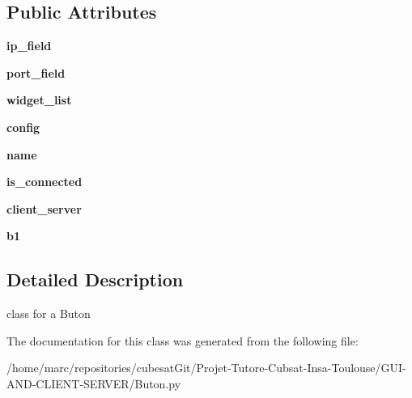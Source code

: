 \subsection*{Public Attributes}
\begin{DoxyCompactItemize}
\item 
\hypertarget{classButon_1_1ConnectButon_a9b455e937c6ad5aab8d6e60ddd9496f5}{{\bfseries ip\+\_\+field}}\label{classButon_1_1ConnectButon_a9b455e937c6ad5aab8d6e60ddd9496f5}

\item 
\hypertarget{classButon_1_1ConnectButon_ab54e8a2c425b7a4c6aff44c2623fbd24}{{\bfseries port\+\_\+field}}\label{classButon_1_1ConnectButon_ab54e8a2c425b7a4c6aff44c2623fbd24}

\item 
\hypertarget{classButon_1_1ConnectButon_a17242a57a26a2c443a62561d4d983741}{{\bfseries widget\+\_\+list}}\label{classButon_1_1ConnectButon_a17242a57a26a2c443a62561d4d983741}

\item 
\hypertarget{classButon_1_1ConnectButon_a6cd823bde194e14b1c175a3c49562cf6}{{\bfseries config}}\label{classButon_1_1ConnectButon_a6cd823bde194e14b1c175a3c49562cf6}

\item 
\hypertarget{classButon_1_1ConnectButon_ad1dd74b57aeaed6fa0d714289c499201}{{\bfseries name}}\label{classButon_1_1ConnectButon_ad1dd74b57aeaed6fa0d714289c499201}

\item 
\hypertarget{classButon_1_1ConnectButon_a284dc0bd6a3af534db6e29e028a2e58d}{{\bfseries is\+\_\+connected}}\label{classButon_1_1ConnectButon_a284dc0bd6a3af534db6e29e028a2e58d}

\item 
\hypertarget{classButon_1_1ConnectButon_a78e95a37da9638f98494cae0779cf003}{{\bfseries client\+\_\+server}}\label{classButon_1_1ConnectButon_a78e95a37da9638f98494cae0779cf003}

\item 
\hypertarget{classButon_1_1ConnectButon_a4832ee9eade05a27e4691aa17a00b16a}{{\bfseries b1}}\label{classButon_1_1ConnectButon_a4832ee9eade05a27e4691aa17a00b16a}

\end{DoxyCompactItemize}


\subsection{Detailed Description}
\begin{DoxyVerb}class for a Buton\end{DoxyVerb}
 

The documentation for this class was generated from the following file\+:\begin{DoxyCompactItemize}
\item 
/home/marc/repositories/cubesat\+Git/\+Projet-\/\+Tutore-\/\+Cubsat-\/\+Insa-\/\+Toulouse/\+G\+U\+I-\/\+A\+N\+D-\/\+C\+L\+I\+E\+N\+T-\/\+S\+E\+R\+V\+E\+R/Buton.\+py\end{DoxyCompactItemize}
